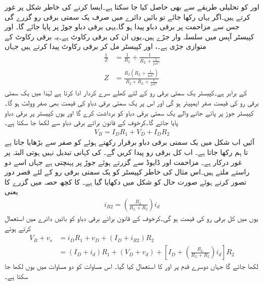 اور  کو تحلیلی طریقے سے بھی حاصل کیا جا سکتا ہے۔ایسا کرنے کی خاطر شکل  پر غور کرتے ہیں۔اگر یہاں  رکھا جائے تو بائیں دائرے میں صرف یک سمتی برقی رو  گزرے گی جس سے مزاحمت  پر برقی دباو  پیدا ہو گا۔یہی برقی دباو جوڑ  پر پایا جائے گا۔ اور کپیسٹر  آپس میں سلسلہ وار جڑے ہیں۔یوں ان کی برقی رکاوٹ  ہے۔یہ برقی رکاوٹ  کے متوازی جڑی ہے۔، اور کپیسٹر مل کر برقی رکاوٹ  پیدا کرتے ہیں جہاں
\begin{align}
\frac{1}{Z}&=\frac{1}{R_2}+\frac{1}{R_L+\frac{1}{j \omega C}}\\
Z&=\frac{R_2 \left(R_L+\frac{1}{j \omega C} \right)}{R_2+R_L+\frac{1}{j \omega C}}
\end{align}
کے برابر ہے۔کپیسٹر یک سمتی برقی رو کے لئے کھلے سرے کردار ادا کرتا ہے لہٰذا  میں یک سمتی برقی رو کی قیمت صفر ایمپیئر ہو گی اور اس پر یک سمتی برقی دباو کی قیمت بھی صفر وولٹ ہو گا۔کپیسٹر  جوڑ  پر پائے جانے والے یک سمتی برقی دباو کو برداشت کرے گا اور یوں کپیسٹر پر  برقی دباو پایا جائے گا۔کرخوف کے قانون برائے برقی دباو سے لکھا جا سکتا ہے۔
\begin{align} \label{مساوات_ٹرانزسٹر_یکسمتی_منبع_بار_مساوات_جزو}
V_B=I_D R_1+V_D+I_D R_2
\end{align}
آئیں اب شکل  میں یک سمتی برقی دباو  برقرار رکھتے ہوئے  کو صفر سے بڑھایا جاتا ہے تا ہم  رکھا جاتا ہے۔ اب کل برقی رو  پیدا کریں گے۔ کی کہانی تبدیل نہیں ہوتی البتہ  پر غور درکار ہے۔ مزاحمت  اور ڈایوڈ سے گزرتے ہوئے جوڑ  پر پہنچتی ہے جہاں اسے دو راستے ملتے ہیں۔اس مثال کی خاطر کپیسٹر کو یک سمتی برقی رو کے لئے قصر دور تصور کرتے ہوئے صورت حال کو شکل میں دکھایا گیا ہے۔ کا کچھ حصہ  میں گزرے کا یعنی
\begin{align}
i_{R2}=\left(\frac{R_L}{R_L+R_2}\right) i_d
\end{align}
یوں  میں کل برقی رو کی قیمت  ہو گی۔کرخوف کے قانون برائے برقی دباو کو بائیں دائرے میں استعمال کرتے ہوئے
\begin{align*}
V_B+v_s&=i_D R_1+v_D+\left(I_D+i_{R2} \right)R_2\\
&=\left(I_D+i_d \right)R_1+ \left(V_D+v_d \right)+\left[I_D+\left(\frac{R_L}{R_L+R_2}\right) i_d \right]R_2
\end{align*}
لکھا جائے گا جہاں دوسرے قدم پر  اور  کا استعمال کیا گیا۔ اس مساوات کو دو مساوات میں یوں لکھا جا سکتا ہے۔
